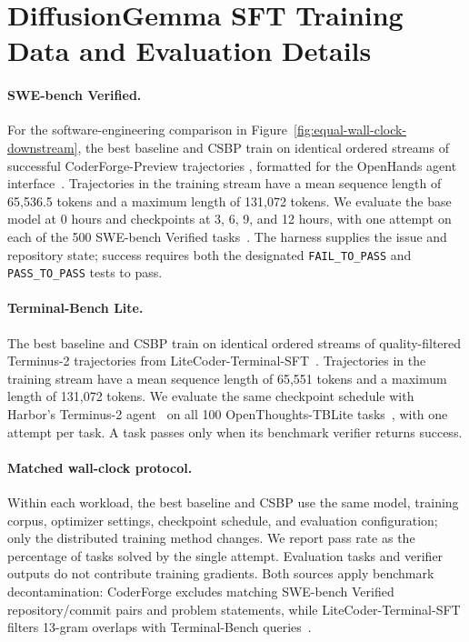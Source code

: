 \section{DiffusionGemma SFT Training Data and Evaluation Details}
\label{app:training-evaluation-details}

\paragraph{SWE-bench Verified.}
For the software-engineering comparison in
Figure~\ref{fig:equal-wall-clock-downstream}, the best baseline and CSBP
train on identical
ordered streams of successful CoderForge-Preview trajectories
\citep{CoderForge2026}, formatted for the OpenHands agent
interface~\citep{wang2025openhands}. Trajectories in the training stream have
a mean sequence length of 65{,}536.5 tokens and a maximum length of
131{,}072 tokens.
We evaluate the base model at 0 hours and
checkpoints at 3, 6, 9, and 12 hours, with one attempt on each of the 500
SWE-bench Verified tasks~\citep{jimenez2024swebench,chowdhury2024swebenchverified}.
The harness supplies the issue and repository state; success requires both the
designated \texttt{FAIL\_TO\_PASS} and \texttt{PASS\_TO\_PASS} tests to pass.

\paragraph{Terminal-Bench Lite.}
The best baseline and CSBP train on identical ordered streams of quality-filtered Terminus-2
trajectories from
LiteCoder-Terminal-SFT~\citep{peng2026litecoderterminal}. Trajectories in the
training stream have a mean sequence length of 65{,}551 tokens and a maximum
length of 131{,}072 tokens. We evaluate the same
checkpoint schedule with Harbor's Terminus-2 agent~\citep{Harbor_Framework}
on all 100 OpenThoughts-TBLite tasks~\citep{OpenThoughts-TBLite}, with one
attempt per task. A task passes only when its benchmark verifier returns success.

\paragraph{Matched wall-clock protocol.}
Within each workload, the best baseline and CSBP use the same model, training corpus,
optimizer settings, checkpoint schedule, and evaluation configuration; only
the distributed training method changes. We report pass rate as the percentage
of tasks solved by the single attempt. Evaluation tasks and verifier outputs do
not contribute training gradients. Both sources apply benchmark decontamination:
CoderForge excludes matching SWE-bench Verified repository/commit pairs and
problem statements, while LiteCoder-Terminal-SFT filters 13-gram overlaps with
Terminal-Bench queries~\citep{CoderForge2026,peng2026litecoderterminal}.

